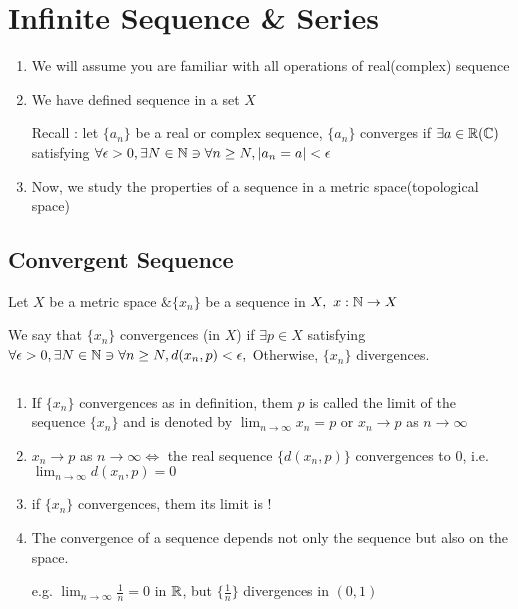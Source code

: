\section{Infinite Sequence \& Series}

\begin{enumerate}[wide,label = $\bullet$]
	\item We will assume you are familiar with all operations of real(complex) sequence
	\item We have defined sequence in a set $X$
	\begin{tcolorbox}
		Recall : let $\{a_n\}$ be a real or complex sequence, $\{a_n\}$ converges if $\exists a \in \mathbb{R} (\mathbb{C})$ satisfying $\forall \epsilon > 0, \exists N \in \mathbb{N} \ni \forall n \geq N , |a_n = a| < \epsilon$
	\end{tcolorbox}
	\item Now, we study the properties of a sequence in a metric space(topological space)
\end{enumerate}

\subsection{Convergent Sequence}

Let $X$ be a metric space $\& \{ x_n\}$ be a sequence in $X,~ x:\mathbb{N} \rightarrow X$

\begin{defn}
	We say that $\{x_n\}$ convergences (in $X$) if $\exists p \in X$ satisfying $\forall \epsilon > 0 ,\exists N \in \mathbb{N} \ni \forall n \geq N, d(x_n,p) < \epsilon,$ Otherwise, $\{x_n\}$ divergences.
\end{defn}

\begin{rmk*}$ $
	\begin{enumerate}
		\item If $\{x_n\}$ convergences as in definition, them $p$ is called the limit of the sequence $\{x_n\}$ and is denoted by $\lim_{n \rightarrow \infty}x_n = p$ or $x_n \rightarrow p$ as $n \rightarrow \infty$
		\item $x_n \rightarrow p$ as $n \rightarrow \infty \Leftrightarrow$ the real sequence $\{d(x_n,p)\}$ convergences to $0$, i.e. $\lim_{n \rightarrow \infty} d(x_n,p) = 0$
		\item if $\{x_n\}$ convergences, them its limit is !
		\item The convergence of a sequence depends not only the sequence but also on the space.
		
		e.g. $\lim_{n\rightarrow \infty}\frac{1}{n} = 0$ in $\mathbb{R}$, but $\{\frac{1}{n}\}$ divergences in $(0,1)$
	\end{enumerate}
\end{rmk*}

